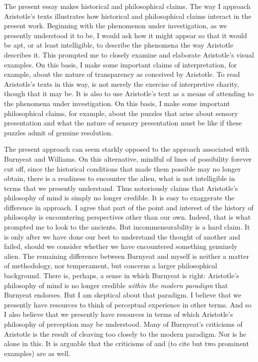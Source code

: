 The present essay makes historical and philosophical claims. The way I approach Aristotle's texts illustrates how historical and philosophical claims interact in the present work. Beginning with the phenomenon under investigation, as we presently understood it to be, I would ask how it might appear so that it would be apt, or at least intelligible, to describe the phenomena the way Aristotle describes it. This prompted me to closely examine and elaborate Aristotle's visual examples. On this basis, I make some important claims of interpretation, for example, about the nature of transparency as conceived by Aristotle. To read Aristotle's texts in this way, is not merely the exercise of interpretive charity, though that it may be. It is also to use Aristotle's text as a means of attending to the phenomena under investigation. On this basis, I make some important philosophical claims, for example, about the puzzles that arise about sensory presentation and what the nature of sensory presentation must be like if these puzzles admit of genuine resolution.

The present approach can seem starkly opposed to the approach associated with Burnyeat and Williams. On this alternative, mindful of lines of possibility forever cut off, since the historical conditions that made them possible may no longer obtain, there is a readiness to encounter the alien, what is not intelligible in terms that we presently understand. Thus \citet{Burnyeat:1992fk} notoriously claims that Aristotle's philosophy of mind is simply no longer credible. It is easy to exaggerate the difference in approach. I agree that part of the point and interest of the history of philosophy is encountering perspectives other than our own. Indeed, that is what prompted me to look to the ancients. But incommensurability is a hard claim. It is only after we have done our best to understand the thought of another and failed, should we consider whether we have encountered something genuinely alien. The remaining difference between Burnyeat and myself is neither a matter of methodology, nor temperament, but concerns a larger philosophical background. There is, perhaps, a sense in which Burnyeat is right: Aristotle's philosophy of mind is no longer credible \emph{within the modern paradigm} that Burnyeat endorses. But I am skeptical about that paradigm. I believe that we presently have resources to think of perceptual experience in other terms. And so I also believe that we presently have resources in terms of which Aristotle's philosophy of perception may be understood. Many of Burnyeat's criticisms of Aristotle is the result of cleaving too closely to the modern paradigm. Nor is he alone in this. It is arguable that the criticisms of \citet{Broadie:1993fk} and \citet{Sorabji:1971fr} (to cite but two prominent examples) are as well.

